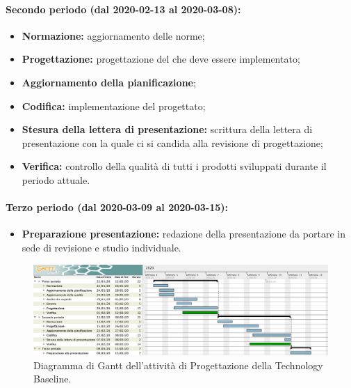 				\paragraph{Secondo periodo (dal 2020-02-13 al 2020-03-08):}
				
					\begin{itemize}
						\item \textbf{Normazione:} aggiornamento delle norme;
						\item \textbf{Progettazione:} progettazione del  che deve essere implementato;
						\item \textbf{Aggiornamento della pianificazione};
						\item \textbf{Codifica:} implementazione del  progettato;
						\item \textbf{Stesura della lettera di presentazione:} scrittura della lettera di presentazione con la quale ci si candida alla revisione di progettazione;
						\item \textbf{Verifica:} controllo della qualità di tutti i prodotti sviluppati durante il periodo attuale.
					\end{itemize}
		
				\paragraph{Terzo periodo (dal 2020-03-09 al 2020-03-15):}
				
					\begin{itemize}
						\item \textbf{Preparazione presentazione:} redazione della presentazione da portare in sede di revisione e studio individuale.
					\end{itemize}

        \begin{landscape}

          \begin{figure}[H]
            \centering
            \includegraphics[width=\linewidth]{images/ganttTechBase}
            \caption{Diagramma di Gantt dell'attività di Progettazione della Technology Baseline.}
          \end{figure}

		\end{landscape}		

